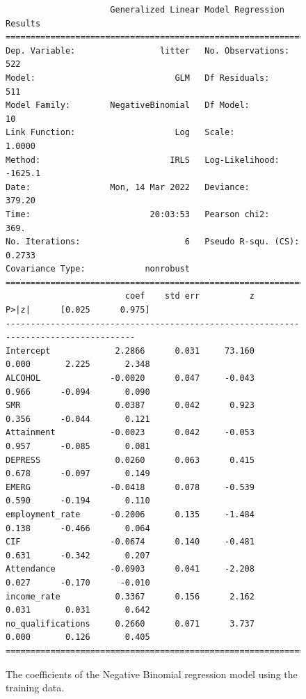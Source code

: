 \documentclass{thesis}
\begin{document}
\begin{figure}[h]
    \centering
\footnotesize
\begin{verbatim}
                     Generalized Linear Model Regression Results                  
==============================================================================
Dep. Variable:                 litter   No. Observations:                  522
Model:                            GLM   Df Residuals:                      511
Model Family:        NegativeBinomial   Df Model:                           10
Link Function:                    Log   Scale:                          1.0000
Method:                          IRLS   Log-Likelihood:                -1625.1
Date:                Mon, 14 Mar 2022   Deviance:                       379.20
Time:                        20:03:53   Pearson chi2:                     369.
No. Iterations:                     6   Pseudo R-squ. (CS):             0.2733
Covariance Type:            nonrobust                                         
=====================================================================================
                        coef    std err          z      P>|z|      [0.025      0.975]
-------------------------------------------------------------------------------------
Intercept             2.2866      0.031     73.160      0.000       2.225       2.348
ALCOHOL              -0.0020      0.047     -0.043      0.966      -0.094       0.090
SMR                   0.0387      0.042      0.923      0.356      -0.044       0.121
Attainment           -0.0023      0.042     -0.053      0.957      -0.085       0.081
DEPRESS               0.0260      0.063      0.415      0.678      -0.097       0.149
EMERG                -0.0418      0.078     -0.539      0.590      -0.194       0.110
employment_rate      -0.2006      0.135     -1.484      0.138      -0.466       0.064
CIF                  -0.0674      0.140     -0.481      0.631      -0.342       0.207
Attendance           -0.0903      0.041     -2.208      0.027      -0.170      -0.010
income_rate           0.3367      0.156      2.162      0.031       0.031       0.642
no_qualifications     0.2660      0.071      3.737      0.000       0.126       0.405
=====================================================================================
\end{verbatim}
\normalsize
    \caption{The coefficients of the Negative Binomial regression model using the training data.}
    \label{fig:nb-coeff}
\end{figure}
\end{document}
